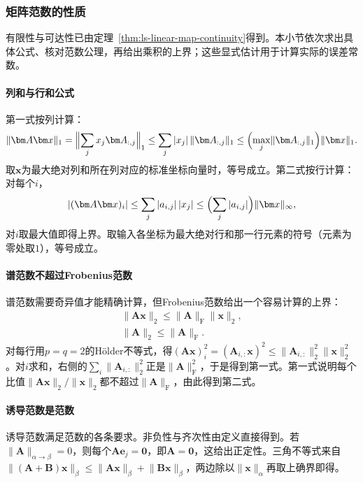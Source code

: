 \subsubsection{矩阵范数的性质}

有限性与可达性已由定理~\ref{thm:ls-linear-map-continuity}得到。本小节依次求出具体公式、核对范数公理，再给出乘积的上界；这些显式估计用于计算实际的误差常数。

\paragraph{列和与行和公式}
第一式按列计算：
\[
 \lVert\bm A\bm x\rVert_1=\Bigl\lVert\sum_jx_j\bm A_{:,j}\Bigr\rVert_1\leq\sum_j|x_j|\,\lVert\bm A_{:,j}\rVert_1\leq\Bigl(\max_j\lVert\bm A_{:,j}\rVert_1\Bigr)\lVert\bm x\rVert_1.
\]
取$\bm x$为最大绝对列和所在列对应的标准坐标向量时，等号成立。第二式按行计算：对每个$i$，
\[
 |(\bm A\bm x)_i|\leq\sum_j|a_{i,j}|\,|x_j|\leq\Bigl(\sum_j|a_{i,j}|\Bigr)\lVert\bm x\rVert_\infty,
\]
对$i$取最大值即得上界。取输入各坐标为最大绝对行和那一行元素的符号（元素为零处取$1$），等号成立。

\paragraph{谱范数不超过Frobenius范数}
谱范数需要奇异值才能精确计算，但Frobenius范数给出一个容易计算的上界：
\[
 \begin{gathered}
 \lVert\bm A\bm x\rVert_2\leq\lVert\bm A\rVert_{\mathrm F}\lVert\bm x\rVert_2,\\
 \lVert\bm A\rVert_2\leq\lVert\bm A\rVert_{\mathrm F}.
 \end{gathered}
\]
对每行用$p=q=2$的Hölder不等式，得$(\bm A\bm x)_i^2=(\bm A_{i,:}\bm x)^2\leq\lVert\bm A_{i,:}\rVert_2^2\lVert\bm x\rVert_2^2$。对$i$求和，右侧的$\sum_i\lVert\bm A_{i,:}\rVert_2^2$正是$\lVert\bm A\rVert_{\mathrm F}^2$，于是得到第一式。第一式说明每个比值$\lVert\bm A\bm x\rVert_2/\lVert\bm x\rVert_2$都不超过$\lVert\bm A\rVert_{\mathrm F}$，由此得到第二式。

\paragraph{诱导范数是范数}
诱导范数满足范数的各条要求。非负性与齐次性由定义直接得到。若$\lVert\bm A\rVert_{\alpha\to\beta}=0$，则每个$\bm A\bm e_j=\bm0$，即$\bm A=\bm0$，这给出正定性。三角不等式来自$\lVert(\bm A+\bm B)\bm x\rVert_\beta\leq\lVert\bm A\bm x\rVert_\beta+\lVert\bm B\bm x\rVert_\beta$，两边除以$\lVert\bm x\rVert_\alpha$再取上确界即得。


